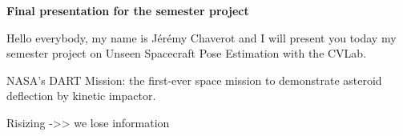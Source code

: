 \documentclass[headsepline,footsepline,footinclude=false,oneside,fontsize=10pt,paper=a4,listof=totoc,bibliography=totoc]{scrbook}
\begin{document}
\begin{center}
	\textbf{Final presentation for the semester project}
\end{center}

\vspace{1cm}

Hello everybody, my name is Jérémy Chaverot and I will present you today my semester project on Unseen Spacecraft Pose Estimation with the CVLab.




NASA’s DART Mission: the first-ever space mission to demonstrate asteroid deflection by kinetic impactor.

Risizing ->> we lose information
\end{document}
